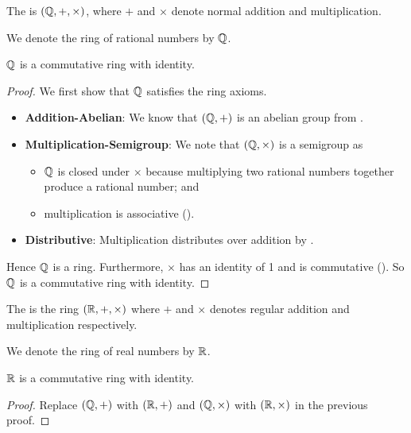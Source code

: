 \begin{definition}
    The  is $(\mathbb{Q}, +, \times)$, where $+$ and $\times$ denote normal addition and multiplication.
\end{definition}
\begin{remark}
    We denote the ring of rational numbers by $\mathbb{Q}$.
\end{remark}
\begin{proposition}
    $\mathbb{Q}$ is a commutative ring with identity.
\end{proposition}
\begin{proof}
    We first show that $\mathbb{Q}$ satisfies the ring axioms.
    \begin{itemize}
        \item \textbf{Addition-Abelian}: We know that $(\mathbb{Q}, +)$ is an abelian group from .
        \item \textbf{Multiplication-Semigroup}: We note that $(\mathbb{Q}, \times)$ is a semigroup as
        \begin{itemize}
            \item $\mathbb{Q}$ is closed under $\times$ because multiplying two rational numbers together produce a rational number; and
            \item multiplication is associative ().
        \end{itemize}
        \item \textbf{Distributive}: Multiplication distributes over addition by .
    \end{itemize}
    Hence $\mathbb{Q}$ is a ring. Furthermore, $\times$ has an identity of 1 and is commutative (). So $\mathbb{Q}$ is a commutative ring with identity.
\end{proof}

\begin{definition}
    The  is the ring $(\mathbb{R}, +, \times)$ where $+$ and $\times$ denotes regular addition and multiplication respectively.
\end{definition}
\begin{remark}
    We denote the ring of real numbers by $\mathbb{R}$.
\end{remark}
\begin{proposition}
    $\mathbb{R}$ is a commutative ring with identity.
\end{proposition}
\begin{proof}
    Replace $(\mathbb{Q}, +)$ with $(\mathbb{R}, +)$ and $(\mathbb{Q}, \times)$ with $(\mathbb{R}, \times)$ in the previous proof.
\end{proof}

